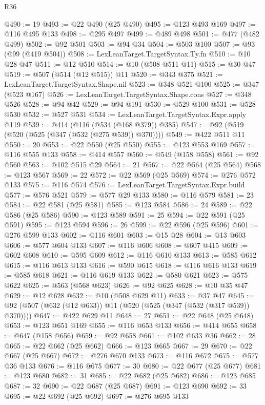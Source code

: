 \begin{lexlean}{R36}
\begin{coremodule}
@490 := 19
@493 := @22 @490 (@25 @490)
@495 := @123 @493 @169
@497 := @116 @495 @133
@498 := @295 @497
@499 := @489 @498
@501 := @477 (@482 @499)
@502 := @92 @501
@503 := @94 @34
@504 := @503 @100
@507 := @93 (@99 (@419 @504))
@508 := LexLeanTarget.TargetSyntax.Ty.fn
@510 := @10 @28 @47
@511 := @12 @510
@514 := @10 (@508 @511 @11)
@515 := @30 @47
@519 := @507 (@514 (@12 @515)) @11
@520 := @343 @375
@521 := LexLeanTarget.TargetSyntax.Shape.nil
@523 := @348 @521 @100
@525 := @347 (@523 @167)
@526 := LexLeanTarget.TargetSyntax.Shape.cons
@527 := @348 @526
@528 := @94 @42
@529 := @94 @191
@530 := @529 @100
@531 := @528 @530
@532 := @527 @531
@534 := LexLeanTarget.TargetSyntax.Expr.apply @119
@539 := @414 (@116 (@534 (@168 @379)) @385)
@547 := @92 (@519 (@520 (@525 (@347 (@532 (@275 @539)) @370))))
@549 := @422 @511 @11
@550 := 20
@553 := @22 @550 (@25 @550)
@555 := @123 @553 @169
@557 := @116 @555 @133
@558 := @414 @557
@560 := @549 (@158 @558)
@561 := @92 @560
@563 := @102 @515 @29
@564 := 21
@567 := @22 @564 (@25 @564)
@568 := @123 @567
@569 := 22
@572 := @22 @569 (@25 @569)
@574 := @276 @572 @133
@575 := @116 @574
@576 := LexLeanTarget.TargetSyntax.Expr.build
@577 := @576 @521
@579 := @577 @29 @133
@580 := @116 @579
@581 := 23
@584 := @22 @581 (@25 @581)
@585 := @123 @584
@586 := 24
@589 := @22 @586 (@25 @586)
@590 := @123 @589
@591 := 25
@594 := @22 @591 (@25 @591)
@595 := @123 @594
@596 := 26
@599 := @22 @596 (@25 @596)
@601 := @276 @599 @133
@602 := @116 @601
@603 := @15 @28
@604 := @13 @603
@606 := @577 @604 @133
@607 := @116 @606
@608 := @607 @415
@609 := @602 @608
@610 := @595 @609
@612 := @116 @610 @133
@613 := @585 @612
@615 := @116 @613 @133
@616 := @590 @615
@618 := @116 @616 @133
@619 := @585 @618
@621 := @116 @619 @133
@622 := @580 @621
@623 := @575 @622
@625 := @563 (@568 @623)
@626 := @92 @625
@628 := @10 @35 @47
@629 := @12 @628
@632 := @10 (@508 @629 @11)
@633 := @37 @47
@645 := @92 (@507 (@632 (@12 @633)) @11 (@520 (@525 (@347 (@532 (@317 @539)) @370))))
@647 := @422 @629 @11
@648 := 27
@651 := @22 @648 (@25 @648)
@653 := @123 @651 @169
@655 := @116 @653 @133
@656 := @414 @655
@658 := @647 (@158 @656)
@659 := @92 @658
@661 := @102 @633 @36
@662 := 28
@665 := @22 @662 (@25 @662)
@666 := @123 @665
@667 := 29
@670 := @22 @667 (@25 @667)
@672 := @276 @670 @133
@673 := @116 @672
@675 := @577 @36 @133
@676 := @116 @675
@677 := 30
@680 := @22 @677 (@25 @677)
@681 := @123 @680
@682 := 31
@685 := @22 @682 (@25 @682)
@686 := @123 @685
@687 := 32
@690 := @22 @687 (@25 @687)
@691 := @123 @690
@692 := 33
@695 := @22 @692 (@25 @692)
@697 := @276 @695 @133

\end{coremodule}
\end{lexlean}
